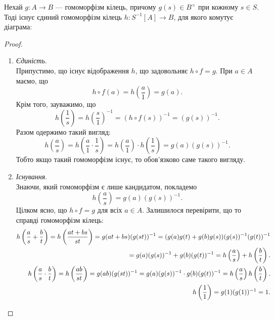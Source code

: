 \documentclass{math_library}
\begin{document}
\begin{theorem}
Нехай $g \colon A \to B$ --- гомоморфізм кілець, причому $g(s) \in B^\times$ при кожному $s \in S$. Тоді існує єдиний гомоморфізм кілець $h \colon S^{-1}[A] \to B$, для якого комутує діаграма:
\begin{figure}[H]
\centering
{}
\end{figure}
\end{theorem}

\begin{proof}
\begin{enumerate}[topsep=0pt,label={\Roman*.},wide=0pt]
\item \textit{Єдиність}.\\
Припустимо, що існує відображення $h$, що задовольняє $h \circ f = g$. При $a \in A$ маємо, що
\[
h \circ f(a) = h\left( \dfrac{a}{1} \right) = g(a).
\]
Крім того, зауважимо, що
\[
h\left( \dfrac{1}{s} \right) = h\left( \dfrac{s}{1} \right)^{-1} = \left( h \circ f (s) \right)^{-1} = (g(s))^{-1}.
\]
Разом одержимо такий вигляд:
\[
h\left( \dfrac{a}{s} \right) = h\left( \dfrac{a}{1} \cdot \dfrac{1}{s} \right) = h\left( \dfrac{a}{1} \right) \cdot h \left( \dfrac{1}{s} \right) = g(a)(g(s))^{-1}.
\]
Тобто якщо такий гомоморфізм існує, то обов'язково саме такого вигляду.

\item \textit{Існування}.\\
Знаючи, який гомоморфізм є лише кандидатом, покладемо
\[
h\left( \dfrac{a}{s} \right) = g(a) (g(s))^{-1}.
\]
Цілком ясно, що $h \circ f = g$ для всіх $a \in A$. Залишилося перевірити, що то справді гомоморфізм кілець:
\begin{align*}
h\left( \dfrac{a}{s} + \dfrac{b}{t} \right) = h\left( \dfrac{at+bs}{st} \right) = g(at+bs) (g(st))^{-1} = (g(a)g(t) + g(b)g(s))(g(s))^{-1} (g(t))^{-1} \\
= g(a)(g(s))^{-1} + g(b)(g(t))^{-1} = h\left( \dfrac{a}{s} \right) + h\left( \dfrac{b}{t} \right). \\
h\left( \dfrac{a}{s} \cdot \dfrac{b}{t} \right) = h\left( \dfrac{ab}{st} \right) = g(ab) (g(st))^{-1} = g(a)(g(s))^{-1} \cdot g(b)(g(t))^{-1} = h\left( \dfrac{a}{s} \right) h\left( \dfrac{b}{t} \right). \\
h\left( \dfrac{1}{1} \right) = g(1)(g(1))^{-1} = 1. \qedhere
\end{align*}
\end{enumerate}
\end{proof}
\end{document}
